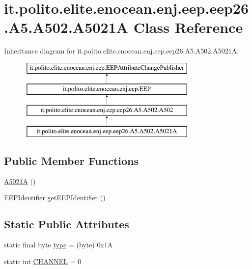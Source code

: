 \hypertarget{classit_1_1polito_1_1elite_1_1enocean_1_1enj_1_1eep_1_1eep26_1_1_a5_1_1_a502_1_1_a5021_a}{}\section{it.\+polito.\+elite.\+enocean.\+enj.\+eep.\+eep26.\+A5.\+A502.\+A5021A Class Reference}
\label{classit_1_1polito_1_1elite_1_1enocean_1_1enj_1_1eep_1_1eep26_1_1_a5_1_1_a502_1_1_a5021_a}
Inheritance diagram for it.\+polito.\+elite.\+enocean.\+enj.\+eep.\+eep26.\+A5.\+A502.\+A5021A\+:\begin{figure}[H]
\begin{center}
\leavevmode
\includegraphics[height=4.000000cm]{classit_1_1polito_1_1elite_1_1enocean_1_1enj_1_1eep_1_1eep26_1_1_a5_1_1_a502_1_1_a5021_a}
\end{center}
\end{figure}
\subsection*{Public Member Functions}
\begin{DoxyCompactItemize}
\item 
\hyperlink{classit_1_1polito_1_1elite_1_1enocean_1_1enj_1_1eep_1_1eep26_1_1_a5_1_1_a502_1_1_a5021_a_af69e667de254349eef890df67753338a}{A5021A} ()
\item 
\hyperlink{classit_1_1polito_1_1elite_1_1enocean_1_1enj_1_1eep_1_1_e_e_p_identifier}{E\+E\+P\+Identifier} \hyperlink{classit_1_1polito_1_1elite_1_1enocean_1_1enj_1_1eep_1_1eep26_1_1_a5_1_1_a502_1_1_a5021_a_a0a0d429901a0149eaf528f0af723fb42}{get\+E\+E\+P\+Identifier} ()
\end{DoxyCompactItemize}
\subsection*{Static Public Attributes}
\begin{DoxyCompactItemize}
\item 
static final byte \hyperlink{classit_1_1polito_1_1elite_1_1enocean_1_1enj_1_1eep_1_1eep26_1_1_a5_1_1_a502_1_1_a5021_a_ab5dd84df89eb9d7f8c6e9b7981e0f284}{type} = (byte) 0x1A
\item 
static int \hyperlink{classit_1_1polito_1_1elite_1_1enocean_1_1enj_1_1eep_1_1eep26_1_1_a5_1_1_a502_1_1_a5021_a_a681331c7aa2e780e3ef77c34780dee58}{C\+H\+A\+N\+N\+EL} = 0
\end{DoxyCompactItemize}
